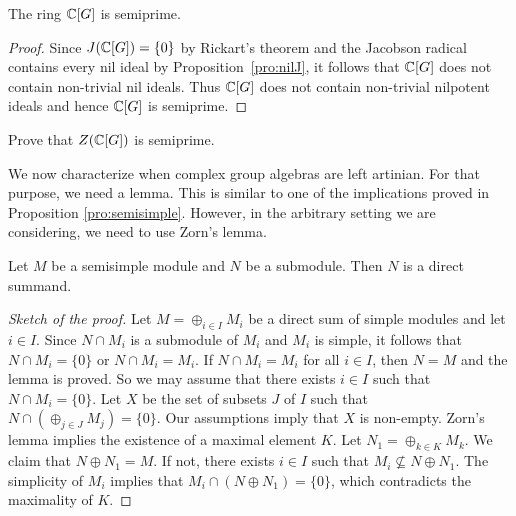 


\begin{corollary}
\label{cor:C[G]_semiprime}
	The ring $\mathbb{C}[G]$ is semiprime.
\end{corollary}

\begin{proof}
	Since $J(\mathbb{C}[G])=\{0\}$ by Rickart's theorem and the Jacobson radical
	contains every nil ideal by Proposition~\ref{pro:nilJ}, it follows that
	$\mathbb{C}[G]$ does not contain non-trivial nil ideals. Thus $\mathbb{C}[G]$ does not
	contain non-trivial nilpotent ideals and hence $\mathbb{C}[G]$ is semiprime.
\end{proof}

\begin{exercise}
	Prove that $Z(\mathbb{C}[G])$ is semiprime.
\end{exercise}

We now characterize when complex group algebras 
are left artinian. For that purpose,
we need a lemma. This is similar to one of the implications proved in Proposition \ref{pro:semisimple}. However,
in the arbitrary setting we are considering, we need to use Zorn's lemma. 

\begin{lemma}
    Let $M$ be a semisimple module and $N$ be a submodule. 
    Then $N$ is a direct summand.
\end{lemma}

\begin{proof}[Sketch of the proof]
    Let $M=\oplus_{i\in I}M_i$ be a direct sum of simple modules  
    and let $i\in I$. 
    Since $N\cap M_i$ is a submodule of $M_i$ and $M_i$ is simple, it follows
    that $N\cap M_i=\{0\}$ or $N\cap M_i=M_i$. If
    $N\cap M_i=M_i$ for all $i\in I$, then $N=M$ and the lemma is proved. So we may assume
    that there exists $i\in I$ such that $N\cap M_i=\{0\}$. Let $X$ be the set
    of subsets $J$ of $I$ such that $N\cap (\oplus_{j\in J}M_j)=\{0\}$. Our assumptions
    imply that $X$ is non-empty. Zorn's lemma implies the existence of 
    a maximal element $K$. Let $N_1=\oplus_{k\in K}M_k$. We claim that
    $N\oplus N_1=M$. If not, there exists $i\in I$ such that
    $M_i\not\subseteq N\oplus N_1$. The simplicity of $M_i$ implies that
    $M_i\cap (N\oplus N_1)=\{0\}$, which contradicts the maximality of $K$. 
\end{proof}

